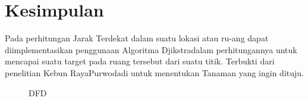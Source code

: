 \documentclass[conference]{IEEEtran}
\begin{document}
\section{Kesimpulan}
Pada perhitungan Jarak Terdekat dalam suatu lokasi atau ru-ang dapat diimplementasikan penggunaan Algoritma Djikstradalam perhitungannya untuk mencapai suatu target pada ruang
tersebut  dari suatu  titik.  Terbukti dari  penelitian Kebun  RayaPurwodadi untuk menentukan Tanaman yang ingin dituju.

\begin{figure}[htbp]
	\centering
	\resizebox{0.5\textwidth}{!}{}
	\caption{DFD}
\end{figure}


\end{document}
